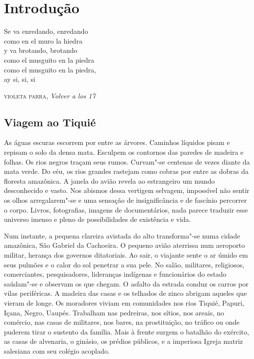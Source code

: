 \chapter{Introdução}

\epigraph{
Se va enredando, enredando\\
como en el muro la hiedra\\
y va brotando, brotando\\ 
como el musguito en la piedra\\
como el musguito en la piedra,\\
ay si, si, si
}{\textsc{violeta parra}, \textit{Volver a los 17}}

\section{Viagem ao Tiquié}\label{viagem-ao-tiquiuxe9}

As águas escuras escorrem por entre as árvores. Caminhos líquidos pisam
e repisam o solo da densa mata. Esculpem os contornos das paredes de
madeira e folhas. Os rios negros traçam seus rumos. Curvam"-se centenas
de vezes diante da mata verde. Do céu, os rios grandes rastejam como
cobras por entre as dobras da floresta amazônica. A janela do avião
revela ao estrangeiro um mundo desconhecido e vasto. Nos abismos dessa
vertigem selvagem, impossível não sentir os olhos arregalarem"-se e uma
sensação de insignificância e de fascínio percorrer o corpo. Livros,
fotografias, imagens de documentários, nada parece traduzir esse
universo imenso e pleno de possibilidades de existência e vida.

Num instante, a pequena clareira avistada do alto transforma"-se numa
cidade amazônica, São Gabriel da Cachoeira. O pequeno avião aterrissa
num aeroporto militar, herança dos governos ditatoriais. Ao sair, o
viajante sente o ar úmido em seus pulmões e o calor do sol penetrar a
sua pele. No salão, militares, religiosos, comerciantes, pesquisadores,
lideranças indígenas e funcionários do estado saúdam"-se e observam os
que chegam. O asfalto da estrada conduz os carros por vilas periféricas.
A madeira das casas e os telhados de zinco abrigam aqueles que vieram de
longe. Os moradores viviam em comunidades nos rios Tiquié, Papuri,
Içana, Negro, Uaupés. Trabalham nas pedreiras, nos sítios, nos areais,
no comércio, nas casas de militares, nos bares, na prostituição, no
tráfico ou onde puderem tirar o sustento da família. Mais à frente
surgem o batalhão do exército, as casas de alvenaria, o ginásio, os
prédios públicos, e a imperiosa Igreja matriz salesiana com seu colégio
acoplado.

